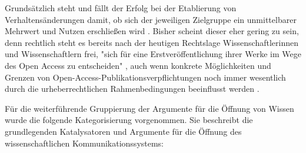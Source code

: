 Grundsätzlich steht und fällt der Erfolg bei der Etablierung von Verhaltensänderungen damit, ob sich der jeweiligen Zielgruppe ein unmittelbarer Mehrwert und Nutzen erschließen wird \cite{Schulze_2013}. Bisher scheint dieser eher gering zu sein, denn rechtlich steht es bereits nach der heutigen Rechtslage Wissenschaftlerinnen und Wissenschaftlern frei, "sich für eine Erstveröffentlichung ihrer Werke im Wege des Open Access zu entscheiden" \cite[:146]{Goetting_2015}, auch wenn konkrete Möglichkeiten und Grenzen von Open-Access-Publikationsverpflichtungen noch immer wesentlich durch die urheberrechtlichen Rahmenbedingungen beeinflusst werden \cite[:211]{Fehling_2014}.

Für die weiterführende Gruppierung der Argumente für die Öffnung von Wissen wurde die folgende Kategorisierung vorgenommen. Sie beschreibt die grundlegenden Katalysatoren und Argumente für die Öffnung des wissenschaftlichen Kommunikationssystems:
